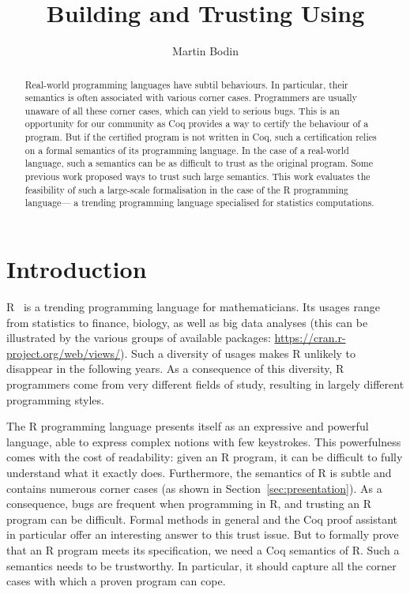 \documentclass[9pt, sigplan, natbib=false]{acmart}
\title{Building and Trusting \R{} Using \Coq{}}
\author{Martin Bodin}
\affiliation{
    \institution{Center of Mathematical Modeling}
    \streetaddress{Beauchef 851}
    \city{Santiago}
    \country{Chile}
}
\newcommand\Coq{Coq}
\newcommand\R{R}
\begin{document}
\begin{abstract}
Real-world programming languages have subtil behaviours.
In particular, their semantics is often associated with
various corner cases.
Programmers are usually unaware of all these corner cases,
which can yield to serious bugs.
This is an opportunity for our community
as \Coq{} provides a way to certify the behaviour of a program.
But if the certified program is not written in \Coq{},
such a certification relies on a formal semantics of its programming language.
In the case of a real-world language, such a semantics
can be as difficult to trust as the original program.
Some previous work proposed ways to trust such large semantics.
This work evaluates the feasibility of such a large-scale formalisation
in the case of the \R{} programming language—%
a trending programming language specialised for statistics computations.
\end{abstract}

\maketitle

\section{Introduction}
\label{sec:introduction}

\R{}~\parencite{Rwebsite} is a trending programming language for mathematicians.
Its usages range from statistics to finance, biology,
as well as big data analyses
(this can be illustrated by the various groups of available packages:
\url{https://cran.r-project.org/web/views/}).
Such a diversity of usages makes \R{} unlikely to disappear
in the following years.
As a consequence of this diversity,
\R{} programmers come from very different fields of study,
resulting in largely different programming styles.

The \R{} programming language presents itself
as an expressive and powerful language,
able to express complex notions with few keystrokes.
This powerfulness comes with the cost of readability:
given an \R{} program, it can be difficult to fully
understand what it exactly does.
Furthermore, the semantics of \R{} is subtle
and contains numerous corner cases
(as shown in Section~\ref{sec:presentation}).
%
As a consequence, bugs are frequent when programming in \R{},
and trusting an \R{} program can be difficult.
Formal methods in general and the \Coq{} proof assistant in particular
offer an interesting answer to this trust issue.
But to formally prove that an \R{} program meets its specification,
we need a \Coq{} semantics of \R{}.
Such a semantics needs to be trustworthy.
In particular, it should capture all the corner cases
with which a proven program can cope.
\end{document}
